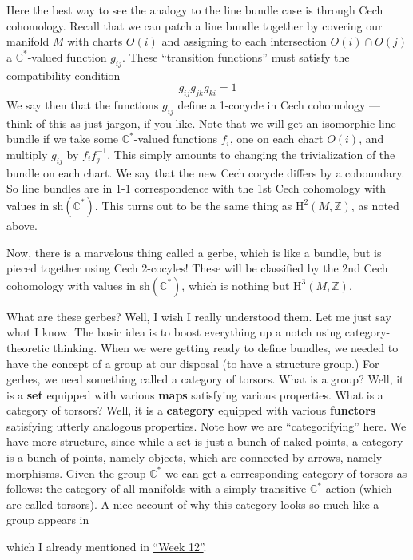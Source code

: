\documentclass[12pt]{article}
\def\tightlist{}
\renewcommand{\texttt}[1]{%
  \begingroup
  \ttfamily
  \begingroup\lccode`~=`/\lowercase{\endgroup\def~}{/\discretionary{}{}{}}%
  \begingroup\lccode`~=`[\lowercase{\endgroup\def~}{[\discretionary{}{}{}}%
  \begingroup\lccode`~=`.\lowercase{\endgroup\def~}{.\discretionary{}{}{}}%
  \catcode`/=\active\catcode`[=\active\catcode`.=\active
  \scantokens{#1\noexpand}%
  \endgroup
}
\begin{document}
Here the best way to see the analogy to the line bundle case is through
Cech cohomology. Recall that we can patch a line bundle together by
covering our manifold \(M\) with charts \(O(i)\) and assigning to each
intersection \(O(i) \cap O(j)\) a \(\mathbb{C}^*\)-valued function
\(g_{ij}\). These ``transition functions'' must satisfy the compatibility
condition 
\[g_{ij} g_{jk} g_{ki} = 1\] 
We say then that the functions
\(g_{ij}\) define a 1-cocycle in Cech cohomology --- think of this as
just jargon, if you like. Note that we will get an isomorphic line
bundle if we take some \(\mathbb{C}^*\)-valued functions \(f_i\), one
on each chart \(O(i)\), and multiply \(g_{ij}\) by \(f_ if_j^{-1}\).
This simply amounts to changing the trivialization of the bundle on each
chart. We say that the new Cech cocycle differs by a coboundary. So line
bundles are in 1-1 correspondence with the 1st Cech cohomology with
values in \(\mathrm{sh}(\mathbb{C}^*)\). This turns out to be the same
thing as \(\mathrm{H}^2(M,\mathbb{Z})\), as noted above.

Now, there is a marvelous thing called a gerbe, which is like a bundle,
but is pieced together using Cech 2-cocyles! These will be classified by
the 2nd Cech cohomology with values in \(\mathrm{sh}(\mathbb{C}^*)\),
which is nothing but \(\mathrm{H}^3(M,\mathbb{Z})\).

What are these gerbes? Well, I wish I really understood them. Let me
just say what I know. The basic idea is to boost everything up a notch
using category-theoretic thinking. When we were getting ready to define
bundles, we needed to have the concept of a group at our disposal (to
have a structure group.) For gerbes, we need something called a category
of torsors. What is a group? Well, it is a \textbf{set} equipped with
various \textbf{maps} satisfying various properties. What is a category
of torsors? Well, it is a \textbf{category} equipped with various
\textbf{functors} satisfying utterly analogous properties. Note how we
are ``categorifying'' here. We have more structure, since while a set is
just a bunch of naked points, a category is a bunch of points, namely
objects, which are connected by arrows, namely morphisms. Given the
group \(\mathbb{C}^*\) we can get a corresponding category of torsors as
follows: the category of all manifolds with a simply transitive
\(\mathbb{C}^*\)-action (which are called torsors). A nice account of
why this category looks so much like a group appears in

\noindent
which I already mentioned in \protect\hyperlink{week12}{``Week 12''}.
\end{document}
